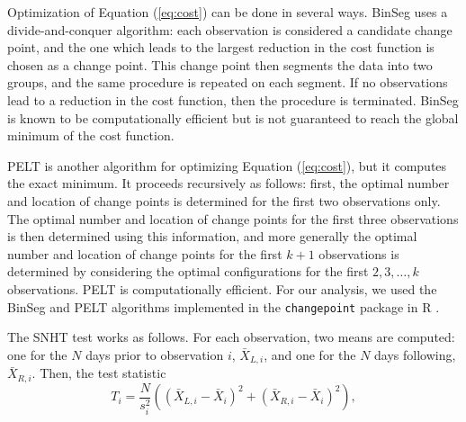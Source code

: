 \documentclass[12pt]{article}
\begin{document}
\begin{doublespacing}
Optimization of Equation (\ref{eq:cost}) can be done in several ways.  BinSeg uses a divide-and-conquer algorithm: each observation is considered a candidate change point, and the one which leads to the largest reduction in the cost function is chosen as a change point.  This change point then segments the data into two groups, and the same procedure is repeated on each segment.  If no observations lead to a reduction in the cost function, then the procedure is terminated.  BinSeg is known to be computationally efficient but is not guaranteed to reach the global minimum of the cost function.

PELT is another algorithm for optimizing Equation (\ref{eq:cost}), but it computes the exact minimum.  It proceeds recursively as follows: first, the optimal number and location of change points is determined for the first two observations  only.  The optimal number and location of change points for the first three observations is then determined using this information, and more generally the optimal number and location of change points for the first $k+1$ observations is determined by considering the optimal configurations for the first $2, 3, \ldots, k$ observations.  PELT is computationally efficient.  For our analysis, we used the BinSeg and PELT algorithms implemented in the \texttt{changepoint} package in R \cite{killick14}.

The SNHT test works as follows.  For each observation, two means are computed: one for the $N$ days prior to observation $i$, $\bar{X}_{L,i}$, and one for the $N$ days following, $\bar{X}_{R,i}$.  Then, the test statistic
\begin{equation}
	T_i = \frac{N}{s_i^2}\left( (\bar{X}_{L,i}-\bar{X}_i)^2 + (\bar{X}_{R,i}-\bar{X}_i)^2\right),
	\label{eq:Hom}
\end{equation}


\end{doublespacing}
\end{document}
